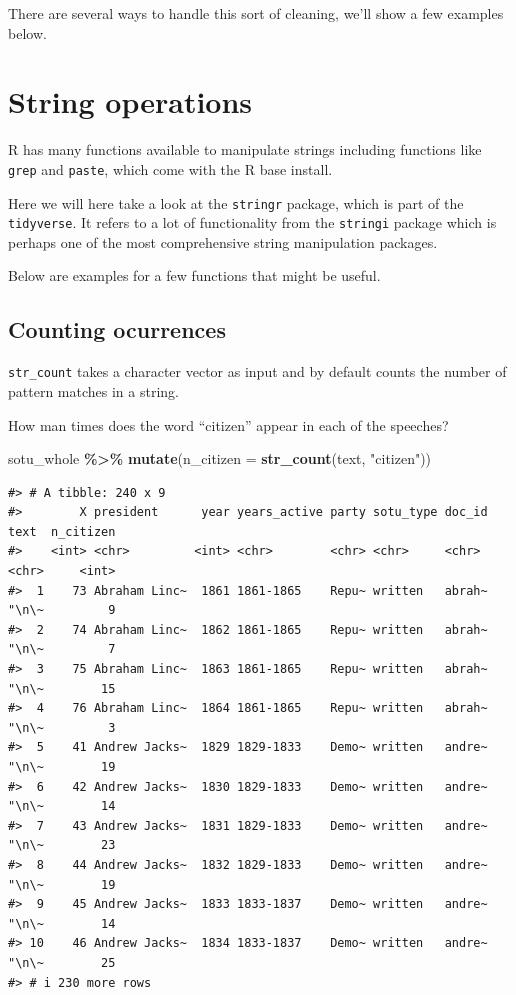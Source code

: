 \documentclass[
]{book}
\newenvironment{Shaded}{\begin{snugshade}}{\end{snugshade}}
\newcommand{\AttributeTok}[1]{\textcolor[rgb]{0.13,0.29,0.53}{#1}}
\newcommand{\FunctionTok}[1]{\textcolor[rgb]{0.13,0.29,0.53}{\textbf{#1}}}
\newcommand{\NormalTok}[1]{#1}
\newcommand{\SpecialCharTok}[1]{\textcolor[rgb]{0.81,0.36,0.00}{\textbf{#1}}}
\newcommand{\StringTok}[1]{\textcolor[rgb]{0.31,0.60,0.02}{#1}}
\begin{document}
There are several ways to handle this sort of cleaning, we'll show a few examples below.

\section{String operations}\label{string-operations}

R has many functions available to manipulate strings including functions like \texttt{grep} and \texttt{paste}, which come with the R base install.

Here we will here take a look at the \texttt{stringr} package, which is part of the \texttt{tidyverse}. It refers to a lot of functionality from the \texttt{stringi} package which is perhaps one of the most comprehensive string manipulation packages.

Below are examples for a few functions that might be useful.

\subsection{Counting ocurrences}\label{counting-ocurrences}

\texttt{str\_count} takes a character vector as input and by default counts the number of pattern matches in a string.

How man times does the word ``citizen'' appear in each of the speeches?

\begin{Shaded}
\begin{Highlighting}[]
\NormalTok{sotu\_whole }\SpecialCharTok{\%\textgreater{}\%} 
    \FunctionTok{mutate}\NormalTok{(}\AttributeTok{n\_citizen =} \FunctionTok{str\_count}\NormalTok{(text, }\StringTok{"citizen"}\NormalTok{)) }
\end{Highlighting}
\end{Shaded}

\begin{verbatim}
#> # A tibble: 240 x 9
#>        X president      year years_active party sotu_type doc_id text  n_citizen
#>    <int> <chr>         <int> <chr>        <chr> <chr>     <chr>  <chr>     <int>
#>  1    73 Abraham Linc~  1861 1861-1865    Repu~ written   abrah~ "\n\~         9
#>  2    74 Abraham Linc~  1862 1861-1865    Repu~ written   abrah~ "\n\~         7
#>  3    75 Abraham Linc~  1863 1861-1865    Repu~ written   abrah~ "\n\~        15
#>  4    76 Abraham Linc~  1864 1861-1865    Repu~ written   abrah~ "\n\~         3
#>  5    41 Andrew Jacks~  1829 1829-1833    Demo~ written   andre~ "\n\~        19
#>  6    42 Andrew Jacks~  1830 1829-1833    Demo~ written   andre~ "\n\~        14
#>  7    43 Andrew Jacks~  1831 1829-1833    Demo~ written   andre~ "\n\~        23
#>  8    44 Andrew Jacks~  1832 1829-1833    Demo~ written   andre~ "\n\~        19
#>  9    45 Andrew Jacks~  1833 1833-1837    Demo~ written   andre~ "\n\~        14
#> 10    46 Andrew Jacks~  1834 1833-1837    Demo~ written   andre~ "\n\~        25
#> # i 230 more rows
\end{verbatim}
\end{document}
